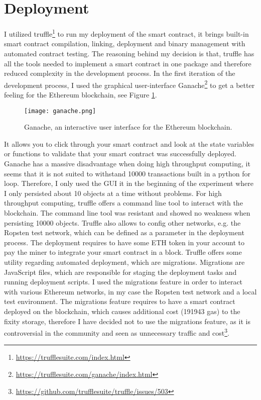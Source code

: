 \section{Deployment}
I utilized truffle\footnote{\url{https://trufflesuite.com/index.html}} to run my deployment of the smart contract, it brings built-in smart contract compilation, linking, deployment and binary management with automated contract testing. The reasoning behind my decision is that, truffle has all the tools needed to implement a smart contract in one package and therefore reduced complexity in the development process. In the first iteration of the development process, I used the graphical user-interface Ganache\footnote{\url{https://trufflesuite.com/ganache/index.html}} to get a better feeling for the Ethereum blockchain, see Figure \ref{fig:ganache}.
\begin{figure}[h]
  \caption{Ganache, an interactive user interface for the Ethereum blockchain.}
  \label{fig:ganache}
    \centering
    \texttt{[image: ganache.png]}
\end{figure}
It allows you to click through your smart contract and look at the state variables or functions to validate that your smart contract was successfully deployed. Ganache has a massive disadvantage when doing high throughput computing, it seems that it is not suited to withstand 10000 transactions built in a python for loop. Therefore, I only used the GUI it in the beginning of the experiment where I only persisted about 10 objects at a time without problems. For high throughput computing, truffle offers a command line tool to interact with the blockchain. The command line tool was resistant and showed no weakness when persisting 10000 objects.
Truffle also allows to config other networks, e.g. the Ropsten test network, which can be defined as a parameter in the deployment process. The deployment requires to have some ETH token in your account to pay the miner to integrate your smart contract in a block. 
Truffle offers some utility regarding automated deployment, which are migrations. Migrations are JavaScript files, which are responsible for staging the deployment tasks and running deployment scripts. I used the migrations feature in order to interact with various Ethereum networks, in my case the Ropsten test network and a local test environment. The migrations feature requires to have a smart contract deployed on the blockchain, which causes additional cost (191943 gas) to the fixity storage, therefore I have decided not to use the migrations feature, as it is controversial in the community and seen as unnecessary traffic and cost\footnote{\url{https://github.com/trufflesuite/truffle/issues/503}}.
